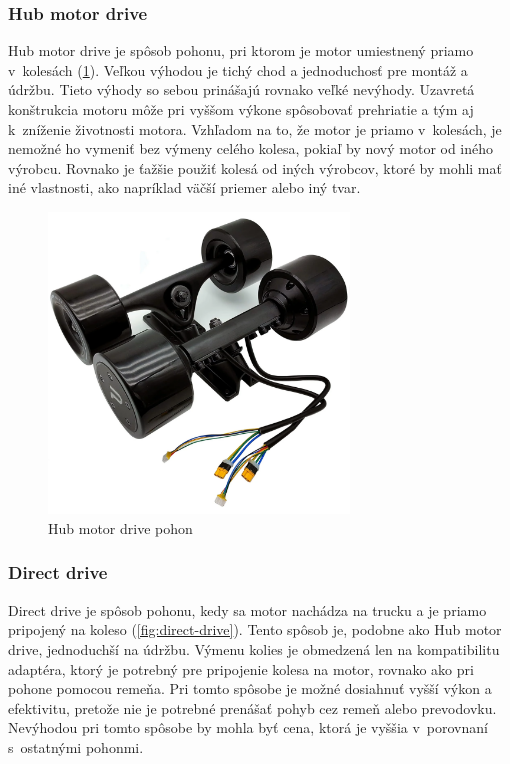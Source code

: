 \subsubsection{Hub motor drive}
Hub motor drive je spôsob pohonu, pri ktorom je motor umiestnený priamo v~kolesách (\ref{fig:hub-drive}).
Veľkou výhodou je tichý chod a jednoduchosť pre montáž a údržbu. 
Tieto výhody so sebou prinášajú rovnako veľké nevýhody.
Uzavretá konštrukcia motoru môže pri vyššom výkone spôsobovať prehriatie a tým aj k~zníženie životnosti motora. 
Vzhľadom na to, že motor je priamo v~kolesách, je nemožné ho vymeniť bez výmeny celého kolesa, pokiaľ by nový motor od iného výrobcu.
Rovnako je ťažšie použiť kolesá od iných výrobcov, ktoré by mohli mať iné vlastnosti, ako napríklad väčší priemer alebo iný tvar.\cite{WikiElectricSkateboard}

\begin{figure}[h]
    \centering
    \includegraphics[height=8cm, width=1\linewidth, keepaspectratio]{obrazky-figures/drive-hub.png}
    \caption{Hub motor drive pohon\cite{Puaida}}\label{fig:hub-drive}
\end{figure}

\newpage

\subsubsection{Direct drive}
Direct drive je spôsob pohonu, kedy sa motor nachádza na trucku a je priamo pripojený na koleso (\ref{fig:direct-drive}).
Tento spôsob je, podobne ako Hub motor drive, jednoduchší na údržbu.
Výmenu kolies je obmedzená len na kompatibilitu adaptéra, ktorý je potrebný pre pripojenie kolesa na motor, rovnako ako pri pohone pomocou remeňa.
Pri tomto spôsobe je možné dosiahnuť vyšší výkon a efektivitu, pretože nie je potrebné prenášať pohyb cez remeň alebo prevodovku.
Nevýhodou pri tomto spôsobe by mohla byť cena, ktorá je vyššia v~porovnaní s~ostatnými pohonmi.\cite{WikiElectricSkateboard}

